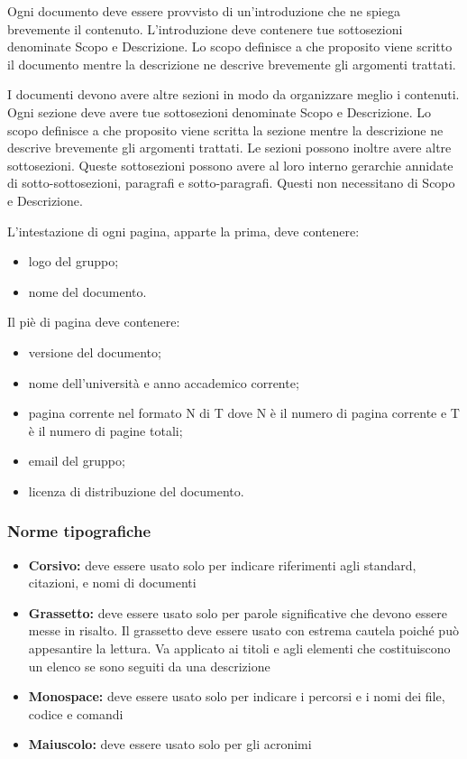 \documentclass[12pt,a4paper]{article}
\begin{document}
Ogni documento deve essere provvisto di un'introduzione che ne spiega brevemente il contenuto. L'introduzione deve contenere tue sottosezioni denominate Scopo e Descrizione. Lo scopo definisce a che proposito viene scritto il documento mentre la descrizione ne descrive brevemente gli argomenti trattati.

I documenti devono avere altre sezioni in modo da organizzare meglio i contenuti. Ogni sezione deve avere tue sottosezioni denominate Scopo e Descrizione. Lo scopo definisce a che proposito viene scritta la sezione mentre la descrizione ne descrive brevemente gli argomenti trattati. Le sezioni possono inoltre avere altre sottosezioni. Queste sottosezioni possono avere al loro interno gerarchie annidate di sotto-sottosezioni,  paragrafi e sotto-paragrafi. Questi non necessitano di Scopo e Descrizione.

L'intestazione di ogni pagina, apparte la prima, deve contenere:
\begin{itemize}
	\item logo del gruppo;
	\item nome del documento.
\end{itemize}
Il piè di pagina deve contenere:
\begin{itemize}
	\item versione del documento;
	\item nome dell'università e anno accademico corrente;
	\item pagina corrente nel formato N di T dove N è il numero di pagina corrente e T è il numero di pagine totali;
	\item email del gruppo;
	\item licenza di distribuzione del documento.
\end{itemize}

\subsubsection{Norme tipografiche}\label{norme tipografiche}

\begin{itemize}
	\item \textbf{Corsivo:} deve essere usato solo per indicare riferimenti agli standard, citazioni,  e nomi di documenti
	\item \textbf{Grassetto:} deve essere usato solo per parole significative che devono essere messe in risalto. Il grassetto deve essere usato con estrema cautela poiché può appesantire la lettura. Va applicato ai titoli e agli elementi che costituiscono un elenco se sono seguiti da una descrizione
	\item \textbf{Monospace:} deve essere usato solo per indicare i percorsi e i nomi dei file, codice e comandi
	\item \textbf{Maiuscolo:} deve essere usato solo per gli acronimi
\end{itemize}
\end{document}

